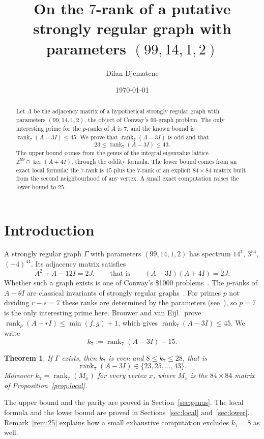 \documentclass[11pt]{amsart}
\title[The $7$-rank of a putative $\mathrm{srg}(99,14,1,2)$]{On the $7$-rank of a putative strongly regular graph with parameters $(99,14,1,2)$}
\author{Dilan Djematene}
\date{\today}
\newtheorem{theorem}{Theorem}
\theoremstyle{remark}
\newcommand{\Z}{\mathbb{Z}}
\DeclareMathOperator{\rk}{rank}
\begin{document}
\begin{abstract}
Let $A$ be the adjacency matrix of a hypothetical strongly regular graph with parameters $(99,14,1,2)$, the
object of Conway's $99$-graph problem. The only interesting prime for the $p$-ranks of $A$ is $7$, and the known
bound is $\rk_7(A-3I)\le 45$. We prove that $\rk_7(A-3I)$ is odd and that
\[
23\le\rk_7(A-3I)\le 43 .
\]
The upper bound comes from the genus of the integral eigenvalue lattice $\Z^{99}\cap\ker(A+4I)$, through the oddity
formula. The lower bound comes from an exact local formula: the $7$-rank is $15$ plus the $7$-rank of an explicit
$84\times84$ matrix built from the second neighbourhood of any vertex. A small exact computation raises the lower bound
to $25$.
\end{abstract}
\maketitle

\section{Introduction}
A strongly regular graph $\Gamma$ with parameters $(99,14,1,2)$ has spectrum $14^1$, $3^{54}$, $(-4)^{44}$. Its
adjacency matrix satisfies
\begin{equation}\label{eq:quad}
A^2+A-12I=2J,\qquad\text{that is}\qquad (A-3I)(A+4I)=2J .
\end{equation}
Whether such a graph exists is one of Conway's \$1000 problems~\cite{Con}. The $p$-ranks of $A-\theta I$ are classical
invariants of strongly regular graphs~\cite{BvE}. For primes $p$ not dividing $r-s=7$ these ranks are determined by the parameters
(see~\cite{BvE}), so $p=7$ is the only interesting prime here. Brouwer and van Eijl~\cite{BvE} prove
$\rk_p(A-rI)\le\min(f,g)+1$, which gives $\rk_7(A-3I)\le 45$. We write
\[
k_7:=\rk_7(A-3I)-15 .
\]

\begin{theorem}\label{thm:main}
If $\Gamma$ exists, then $k_7$ is even and $8\le k_7\le 28$, that is
\[
\rk_7(A-3I)\in\{23,25,\dots,43\}.
\]
Moreover $k_7=\rk_7(M_x)$ for every vertex $x$, where $M_x$ is the $84\times84$ matrix of Proposition~\ref{prop:local}.
\end{theorem}

The upper bound and the parity are proved in Section~\ref{sec:genus}. The local formula and the lower bound are proved in
Sections~\ref{sec:local} and~\ref{sec:lower}. Remark~\ref{rem:25} explains how a small exhaustive computation excludes
$k_7=8$ as well.
\end{document}
